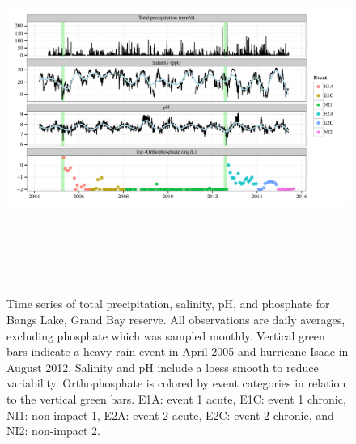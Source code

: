 \documentclass[letterpaper,12pt]{article}\usepackage[]{graphicx}\usepackage[]{color}
\makeatletter
\def\maxwidth{ %
  \ifdim\Gin@nat@width>\linewidth
    \linewidth
  \else
    \Gin@nat@width
  \fi
}
\makeatother
\begin{document}
\setcounter{figure}{1}
\setcounter{table}{1}

\begin{landscape}
\centering\vspace*{\fill}
\begin{figure}[!ht]

{\centering \includegraphics[width=\maxwidth,height=4.8in]{figs/tsplot-1} 

}

\caption[Time series of total precipitation, salinity, pH, and phosphate for Bangs Lake, Grand Bay reserve]{Time series of total precipitation, salinity, pH, and phosphate for Bangs Lake, Grand Bay reserve.  All observations are daily averages, excluding phosphate which was sampled monthly.  Vertical green bars indicate a heavy rain event in April 2005 and hurricane Isaac in August 2012.  Salinity and pH include a loess smooth to reduce variability. Orthophosphate is colored by event categories in relation to the vertical green bars.  E1A: event 1 acute, E1C: event 1 chronic, NI1: non-impact 1, E2A: event 2 acute, E2C: event 2 chronic, and NI2: non-impact 2.}\label{fig:tsplot}
\end{figure}


\end{landscape}
\clearpage
\end{document}
